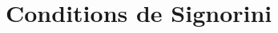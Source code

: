\documentclass[11pt]{book}
\def\n{{\bf n}}
\newcommand{\dnu}{\partial_{\n} u}
\newcommand{\dnv}{\partial_{\n} v}
\begin{document}


\chapter{Conditions de Signorini}
\label{sect:setting}
\end{document}
